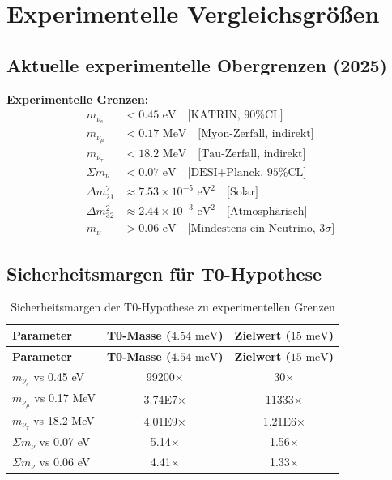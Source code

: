 	\section{Experimentelle Vergleichsgrößen}
	
	\subsection{Aktuelle experimentelle Obergrenzen (2025)}
	
	\begin{experimental}
		\textbf{Experimentelle Grenzen:}
		\begin{align}
			m_{\nu_e} &< 0.45 \text{ eV} \quad \text{[KATRIN, 90\% CL]} \\
			m_{\nu_\mu} &< 0.17 \text{ MeV} \quad \text{[Myon-Zerfall, indirekt]} \\
			m_{\nu_\tau} &< 18.2 \text{ MeV} \quad \text{[Tau-Zerfall, indirekt]} \\
			\Sigma m_\nu &< 0.07 \text{ eV} \quad \text{[DESI+Planck, 95\% CL]} \\
			\Delta m^2_{21} &\approx 7.53 \times 10^{-5} \text{ eV}^2 \quad \text{[Solar]} \\
			\Delta m^2_{32} &\approx 2.44 \times 10^{-3} \text{ eV}^2 \quad \text{[Atmosphärisch]} \\
			m_\nu &> 0.06 \text{ eV} \quad \text{[Mindestens ein Neutrino, 3}\sigma\text{]}
		\end{align}
	\end{experimental}
	
	\subsection{Sicherheitsmargen für T0-Hypothese}
	
	\begin{longtable}[c]{@{}lcc@{}}
		\caption{Sicherheitsmargen der T0-Hypothese zu experimentellen Grenzen} \\
		\toprule
		\textbf{Parameter} & \textbf{T0-Masse (\(4.54 \text{ meV}\))} & \textbf{Zielwert (\(15 \text{ meV}\))} \\
		\midrule
		\endfirsthead
		\toprule
		\textbf{Parameter} & \textbf{T0-Masse (\(4.54 \text{ meV}\))} & \textbf{Zielwert (\(15 \text{ meV}\))} \\
		\midrule
		\endhead
		$m_{\nu_e}$ vs 0.45 eV & 99200× & 30× \\
		$m_{\nu_\mu}$ vs 0.17 MeV & 3.74E7× & 11333× \\
		$m_{\nu_\tau}$ vs 18.2 MeV & 4.01E9× & 1.21E6× \\
		\midrule
		$\Sigma m_\nu$ vs 0.07 eV & 5.14× & 1.56× \\
		$\Sigma m_\nu$ vs 0.06 eV & 4.41× & 1.33× \\
		\bottomrule
	\end{longtable}
	
